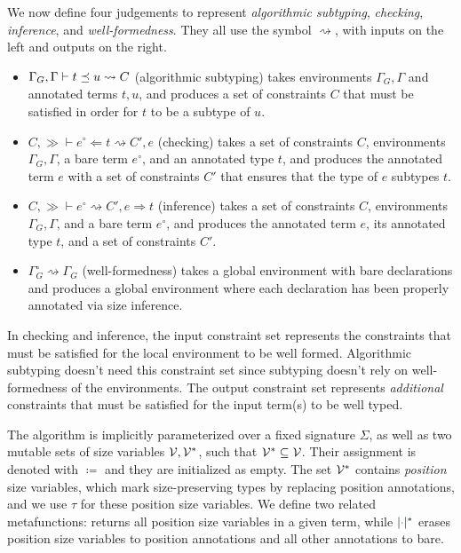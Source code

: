 We now define four judgements to represent \emph{algorithmic subtyping}, \emph{checking}, \emph{inference}, and \emph{well-formed\-ness}.
They all use the symbol $\rightsquigarrow$, with inputs on the left and outputs on the right.
\begin{itemize}
  \item $\Gamma_G, \Gamma \vdash t \preceq u \rightsquigarrow C$ (algorithmic subtyping) takes environments $\Gamma_G, \Gamma$ and annotated terms $t, u$, and produces a set of constraints $C$ that must be satisfied in order for $t$ to be a subtype of $u$.
  \item $C, \gg \vdash e^\circ \Leftarrow t \rightsquigarrow C', e$ (checking)
  takes a set of constraints $C$, environments $\Gamma_G, \Gamma$,
  a bare term $e^\circ$, and an annotated type $t$,
  and produces the annotated term $e$ with a set of constraints $C'$
  that ensures that the type of $e$ subtypes $t$.
  \item $C, \gg \vdash e^\circ \rightsquigarrow C', e \Rightarrow t$ (inference)
  takes a set of constraints $C$, environments $\Gamma_G, \Gamma$,
  and a bare term $e^\circ$, and produces the annotated term $e$, its annotated type $t$, and a set of constraints $C'$.
  \item $\Gamma_G^\circ \rightsquigarrow \Gamma_G$ (well-formedness) takes a global environment with bare declarations and produces a global environment where each declaration has been properly annotated via size inference.
\end{itemize}

In checking and inference, the input constraint set represents the constraints that must be satisfied
for the local environment to be well formed.
Algorithmic subtyping doesn't need this constraint set since subtyping doesn't rely on well-formedness of the environments.
The output constraint set represents \emph{additional} constraints that must be satisfied
for the input term(s) to be well typed.

The algorithm is implicitly parameterized over a fixed signature $\Sigma$,
as well as two mutable sets of size variables $\mathcal{V}, \mathcal{V}^*$, such that $\mathcal{V}^* \subseteq \mathcal{V}$.
Their assignment is denoted with $\coloneqq$ and they are initialized as empty.
The set $\mathcal{V}^*$ contains \textit{position} size variables,
which mark size-preserving types by replacing position annotations,
and we use $\tau$ for these position size variables.
We define two related metafunctions: \PV returns all position size variables in a given term,
while $\erase{\ph}^*$ erases position size variables to position annotations and all other annotations to bare.

